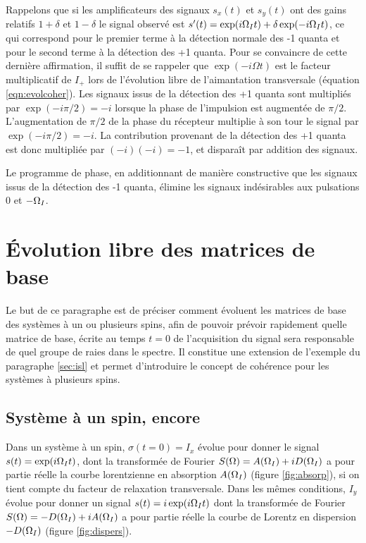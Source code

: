 Rappelons que si les amplificateurs des signaux $s_x(t)$ et $s_y(t)$
ont des gains relatifs $1+\delta$ et $1-\delta$ le signal
observé est $s'(t)=\exp(i\Omega_I t) + \delta\exp(-i\Omega_I t)$,
ce qui correspond pour le premier terme à la détection normale des -1 quanta
et pour le second terme à la détection des +1 quanta.
Pour se convaincre de cette dernière affirmation, il suffit de se rappeler
que $\exp(-i\Omega t)$ est le facteur multiplicatif de $I_+$ lors de l'évolution
libre de l'aimantation transversale (équation \ref{eqn:evolcoher}).
Les signaux issus de la détection des +1 quanta sont multipliés
par $\exp(-i\pi/2) = -i$ lorsque la phase de l'impulsion est augmentée de $\pi/2$.
L'augmentation de $\pi/2$ de la phase du récepteur multiplie à son tour
le signal par $\exp(-i\pi/2) = -i$.
La contribution provenant de la détection des +1 quanta est donc multipliée
par $(-i)(-i)=-1$, et disparaît par addition des signaux.

Le programme de phase, en additionnant de manière constructive
que les signaux issus de la détection des -1 quanta, élimine
les signaux indésirables aux pulsations 0 et $-\Omega_I$.

\section{Évolution libre des matrices de base}

Le but de ce paragraphe est de préciser comment évoluent les 
matrices de base des systèmes à un ou plusieurs spins, afin de pouvoir prévoir rapidement 
quelle matrice de base, écrite au temps $t=0$ de l'acquisition du signal
sera responsable de quel groupe de raies dans le spectre.
Il constitue une extension de l'exemple du paragraphe \ref{sec:isl}
et permet d'introduire le concept de cohérence pour les systèmes à
plusieurs spins.

\subsection{Système à un spin, encore}
Dans un système à un spin, $\sigma(t=0) = I_x$ évolue pour donner le signal 
$s(t) = \exp(i \Omega_I t)$, 
dont la transformée de Fourier $S(\Omega) = A(\Omega_I) + iD(\Omega_I)$ a pour
partie réelle la courbe lorentzienne en 
absorption $A(\Omega_I)$ (figure \ref{fig:absorp}), 
si on tient compte du facteur de relaxation transversale. 
Dans les mêmes conditions, $I_y$ évolue pour donner un signal $s(t) = i\exp(i \Omega_I t)$
dont la transformée de Fourier $S(\Omega) = -D(\Omega_I) + iA(\Omega_I)$
a pour partie réelle la courbe de Lorentz en dispersion $-D(\Omega_I)$
(figure \ref{fig:dispers}).


